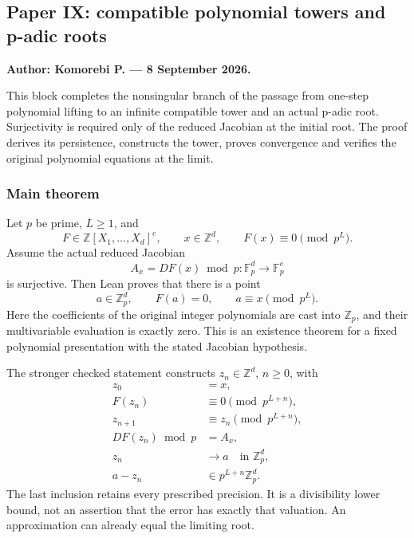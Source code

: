 \hypertarget{cont3:paper-ix-compatible-polynomial-towers-and-p-adic-roots}{%
\subsection{Paper IX: compatible polynomial towers and p-adic
roots}\label{cont3:paper-ix-compatible-polynomial-towers-and-p-adic-roots}}

\textbf{Author: Komorebi P. --- 8 September 2026.}

This block completes the nonsingular branch of the passage from one-step
polynomial lifting to an infinite compatible tower and an actual p-adic
root. Surjectivity is required only of the reduced Jacobian at the
initial root. The proof derives its persistence, constructs the tower,
proves convergence and verifies the original polynomial equations at the
limit.

\hypertarget{cont3:main-theorem}{%
\subsubsection{Main theorem}\label{cont3:main-theorem}}

Let \(p\) be prime, \(L\ge1\), and \[
F\in\mathbb Z[X_1,\ldots,X_d]^e,\qquad x\in\mathbb Z^d,
\qquad F(x)\equiv0\pmod{p^L}.
\] Assume the actual reduced Jacobian \[
A_x=DF(x)\bmod p:\mathbb F_p^d\longrightarrow\mathbb F_p^e
\] is surjective. Then Lean proves that there is a point \[
\boxed{a\in\mathbb Z_p^d,\qquad F(a)=0,\qquad
 a\equiv x\pmod{p^L}.}
\] Here the coefficients of the original integer polynomials are cast
into \(\mathbb Z_p\), and their multivariable evaluation is exactly
zero. This is an existence theorem for a fixed polynomial presentation
with the stated Jacobian hypothesis.

The stronger checked statement constructs \(z_n\in\mathbb Z^d\),
\(n\ge0\), with \[
\begin{aligned}
z_0&=x,\\
F(z_n)&\equiv0\pmod{p^{L+n}},\\
z_{n+1}&\equiv z_n\pmod{p^{L+n}},\\
DF(z_n)\bmod p&=A_x,\\
z_n&\longrightarrow a\quad\text{in }\mathbb Z_p^d,\\
a-z_n&\in p^{L+n}\mathbb Z_p^d.
\end{aligned}
\] The last inclusion retains every prescribed precision. It is a
divisibility lower bound, not an assertion that the error has exactly
that valuation. An approximation can already equal the limiting root.

